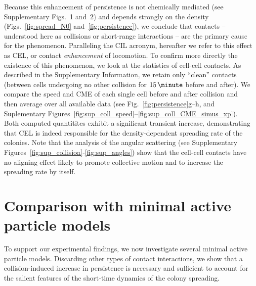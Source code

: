 \documentclass[11pt, twocolumn]{article}
\newcommand\rev[1]{{#1}}
\begin{document}
  Because this enhancement of persistence is not chemically mediated
  (see Supplementary Figs.~1 and~2) and depends strongly on the
  density (Figs.~\ref{fig:spread_N0} and~\ref{fig:persistence}), we
  conclude that contacts -- understood here as collisions or
  short-range interactions -- are the primary cause for the
  phenomenon. Paralleling the CIL acronym, hereafter we refer to this
  effect as CEL, or contact {\em enhancement} of locomotion.  \rev{ To
    confirm more directly the existence of this phenomenon, we look at
    the statistics of cell-cell contacts.  As described in the
    Supplementary Information, we retain only ``clean'' contacts
    (between cells undergoing no other collision for $15\,\minute$
    before and after). We compare the speed and CME of each single
    cell before and after collision and then average over all
    available data (see Fig.~\ref{fig:persistence}g--h, and
    Suplementary Figures~\ref{fig:sup_coll_speed}--\ref{fig:sup_coll_CME_simus_xp}). Both computed quantitites exhibit a
    significant transient increase, demonstrating that CEL is indeed
    responsible for the density-dependent spreading rate of the
    colonies. Note that the analysis of the angular scattering (see Supplementary Figures~\ref{fig:sup_collision}-\ref{fig:sup_angles}) show that the cell-cell contacts have
    no aligning effect likely to promote collective motion and to increase
    the spreading rate by itself.}

\section*{Comparison with minimal active particle models}
To support our experimental findings, we now investigate several
minimal active particle models. Discarding other types of contact
interactions, we show that a collision-induced increase in persistence
is necessary and sufficient to account for the salient features of the
short-time dynamics of the colony spreading. 
\end{document}
